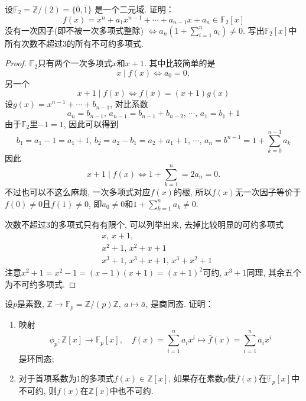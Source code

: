 \begin{problem}
    设$\mathbb{F}_2 = \mathbb{Z}/(2) = \{\bar{0}, \bar{1}\}$
是一个二元域. 证明：
\[
    f(x) = x^n + a_1x^{n - 1} + \cdots + a_{n - 1}x + a_n \in \mathbb{F}_2[x]
\]
没有一次因子(即不被一次多项式整除)
\(
    \Leftrightarrow a_n\left(1 + \sum_{i = 1}^n a_i\right) \neq 0.
\)
写出$\mathbb{F}_2[x]$中所有次数不超过$3$的所有不可约多项式.
\end{problem}

\begin{proof}
    $\mathbb{F}_2$只有两个一次多项式$x$和$x + 1$. 其中比较简单的是
    \[
        x \mid f(x) \iff a_0 = 0,
    \]
    另一个
    \[
        x + 1 \mid f(x) \iff f(x) = (x + 1)g(x)
    \]
    设$g(x) = x^{n - 1} + \cdots + b_{n - 1}$, 对比系数
    \[
        a_n = b_{n - 1},\, a_{n - 1} = b_{n - 1} + b_{n - 2},\, \cdots,\, a_{1} = b_1 + 1
    \]
    由于$\mathbb{F}_2$里$-1 = 1$, 因此可以得到
    \[
        b_1 = a_1 - 1 = a_1 + 1,\, b_2 = a_2 - b_1 = a_2 + a_1 + 1,\, \cdots,\, a_n = b^{n - 1} = 1 + \sum_{k = 0}^{n - 1} a_k
    \]
    因此
    \[
        x + 1 \mid f(x) \iff 1 + \sum_{k = 1}^{n} = 2a_n = 0.
    \]
    不过也可以不这么麻烦, 一次多项式对应$f(x)$的根, 所以$f(x)$无一次因子等价于$f(0) \neq 0$且$f(1) \neq 0$, 即$a_0 \neq 0$和$1 + \sum_{k = 1}^{n} a_k \neq 0$.

    次数不超过$3$的多项式只有有限个, 可以列举出来, 去掉比较明显的可约多项式
    \[
    \begin{aligned}
        &x,\, x + 1,\\
        &x^2 + 1,\, x^2 + x + 1\\
        &x^3 + 1,\, x^3 + x + 1,\, x^3 + x^2 + 1
    \end{aligned}
    \]
    注意$x^2 + 1 = x^2 - 1 = (x - 1)(x + 1) = (x + 1)^2$可约, $x^3 + 1$同理, 其余五个为不可约多项式.
\end{proof}

\begin{problem}
    设$p$是素数, $\mathbb{Z} \to \mathbb{F}_p = \mathbb{Z}/(p)\mathbb{Z},~a \mapsto \bar{a}$,
是商同态. 证明：
\begin{enumerate}[(1)]
    \item 映射
\[
    \phi_p:\mathbb{Z}[x] \to \mathbb{F}_p[x],\quad f(x) = \sum_{i = 1}^n a_ix^i \mapsto \bar{f}(x) = \sum_{i = 1}^n \bar{a}_ix^i
\]
是环同态;
    \item 对于首项系数为$1$的多项式$f(x) \in \mathbb{Z}[x]$,
如果存在素数$p$使$\bar{f}(x)$在$\mathbb{F}_p[x]$中不可约, 
则$f(x)$在$\mathbb{Z}[x]$中也不可约.
\end{enumerate}
\end{problem}

